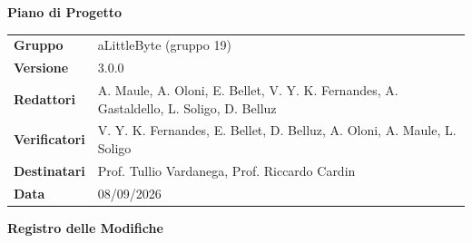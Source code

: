 \documentclass[a4paper,12pt]{article}
\begin{document}
\thispagestyle{firstpage}

\vspace*{0.5cm}

\begin{center}
    {\LARGE \textbf{Piano di Progetto}}
\end{center}

\vspace{1.5cm}

\begin{center}
    \renewcommand{\arraystretch}{1.3}
    \begin{tcolorbox}[
        width=0.92\textwidth,
        colback=gray!6,
        colframe=gray!45,
        boxrule=0.5pt,
        arc=2mm,
        boxsep=0pt,
        left=8pt, right=8pt, top=8pt, bottom=8pt
    ]
        \begin{tabularx}{\linewidth}{>{\bfseries}p{3.5cm} X}
            Gruppo      & aLittleByte (gruppo 19) \\
            Versione & 3.0.0 \\
            Redattori   & A. Maule, A. Oloni, E. Bellet, V. Y. K. Fernandes, A. Gastaldello, L. Soligo, D. Belluz \\
            Verificatori &  V. Y. K. Fernandes, E. Bellet, D. Belluz, A. Oloni, A. Maule, L. Soligo \\
            Destinatari & Prof. Tullio Vardanega, Prof. Riccardo Cardin \\
            Data        & 08/09/2026
        \end{tabularx}
    \end{tcolorbox}
\end{center}

\newpage
{}

\begin{center}
    {\Large \textbf{Registro delle Modifiche}}
\end{center}

\vspace{0.35cm}
\renewcommand{\arraystretch}{1.35}
\end{document}
